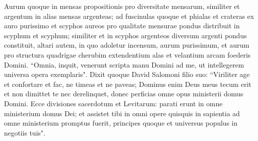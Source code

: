 \begin{biblechapter}
\verse Aurum quoque in mensas propositionis pro diversitate mensarum, similiter et argentum in alias mensas argenteas;  
\verse ad fuscinulas quoque et phialas et crateras ex auro purissimo et scyphos aureos pro qualitate mensurae pondus distribuit in scyphum et scyphum; similiter et in scyphos argenteos diversum argenti pondus constituit, 
\verse altari autem, in quo adoletur incensum, aurum purissimum, et aurum pro structura quadrigae cherubim extendentium alas et velantium arcam foederis Domini. 
\verse “Omnia, inquit, venerunt scripta manu Domini ad me, ut intellegerem universa opera exemplaris". 
\verse Dixit quoque David Salomoni filio suo: “Viriliter age et confortare et fac, ne timeas et ne paveas; Dominus enim Deus meus tecum erit et non dimittet te nec derelinquet, donec perficias omne opus ministerii domus Domini. 
\verse Ecce divisiones sacerdotum et Levitarum: parati erunt in omne ministerium domus Dei; et assistet tibi in omni opere quisquis in sapientia ad omne ministerium promptus fuerit, principes quoque et universus populus in negotiis tuis". 
\end{biblechapter}

